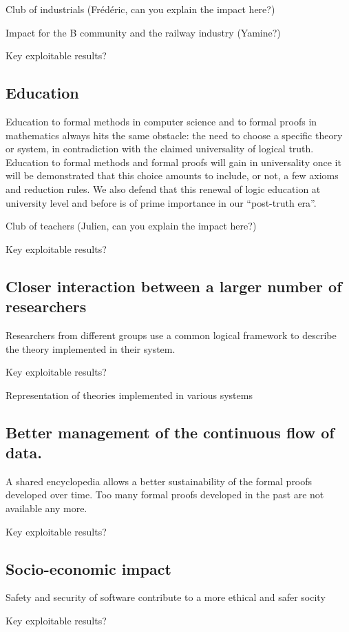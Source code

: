 {\color{red} Club of industrials (Frédéric, can 
you explain the impact here?)}

{\color{red} Impact for the {\sc B} community and the railway industry
  (Yamine?)}

{\color{red} Key exploitable results?}

\subsection{Education}

Education to formal methods in computer science and to formal proofs
in mathematics always hits the same obstacle: the need to choose a
specific theory or system, in contradiction with the claimed
universality of logical truth. Education to formal methods and formal
proofs will gain in universality once it will be demonstrated that
this choice amounts to include, or not, a few axioms and reduction
rules. We also defend that this renewal of logic education at
university level and before is of prime importance in our ``post-truth
era''.

{\color{red} Club of teachers (Julien, can you explain the impact here?)}

{\color{red} Key exploitable results?}

\subsection{Closer interaction between a larger number of researchers}

Researchers from different groups use a common logical framework to
describe the theory implemented in their system.

{\color{red} Key exploitable results?}

Representation of theories implemented in various systems


\subsection{Better management of the continuous flow of data.}

A shared encyclopedia allows a better sustainability of the formal
proofs developed over time. Too many formal proofs developed in the
past are not available any more.

{\color{red} Key exploitable results?}

\subsection{Socio-economic impact}

{\color{red} Safety and security of software contribute to a more ethical
  and safer socity}

{\color{red} Key exploitable results?}
